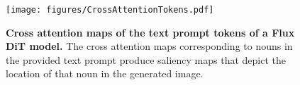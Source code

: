 \begin{figure}
    \centering
    \texttt{[image: figures/CrossAttentionTokens.pdf]}
    \vspace{-0.2in}
    \caption{\textbf{Cross attention maps of the text prompt tokens of a Flux DiT model. } The cross attention maps corresponding to nouns in the provided text prompt produce saliency maps that depict the location of that noun in the generated image. }
    \label{fig:enter-label}
\end{figure}






















